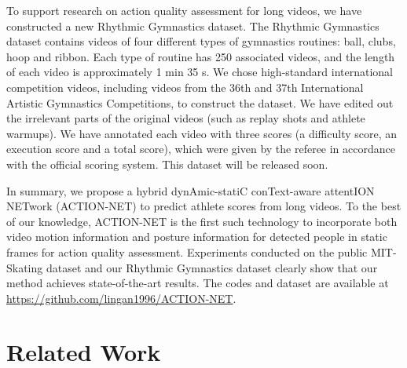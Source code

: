 \documentclass[sigconf]{acmart}
\begin{document}
To support research on action quality assessment for long videos, we have constructed a new Rhythmic Gymnastics dataset. The Rhythmic Gymnastics dataset contains videos of four different types of gymnastics routines: ball, clubs, hoop and ribbon. Each type of routine has 250 associated videos, and the length of each video is approximately 1 min 35 s. We chose high-standard international competition videos, including videos from the 36th and 37th International Artistic Gymnastics Competitions, to construct the dataset. We have edited out the irrelevant parts of the original videos (such as replay shots and athlete warmups). We have annotated each video with three scores (a difficulty score, an execution score and a total score), which were given by the referee in accordance with the official scoring system. This dataset will be released soon.


In summary, we propose a hybrid dynAmic-statiC conText-aware attentION NETwork (ACTION-NET) to predict athlete scores from long videos. To the best of our knowledge, ACTION-NET is the first such technology to incorporate both video motion information and posture information for detected people in static frames for action quality assessment. Experiments conducted on the public MIT-Skating dataset and our Rhythmic Gymnastics dataset clearly show that our method achieves state-of-the-art results. The codes and dataset are available at \url{https://github.com/lingan1996/ACTION-NET}.

\section{Related Work}
\end{document}
